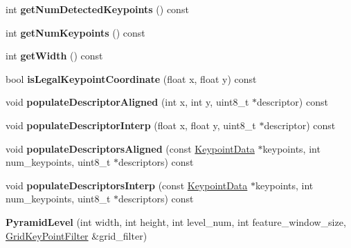 \begin{DoxyCompactItemize}
\item 
\hypertarget{classfovis_1_1PyramidLevel_a6b34494d5f8a1666d216bae16f25640b}{
int {\bfseries getNumDetectedKeypoints} () const }
\label{classfovis_1_1PyramidLevel_a6b34494d5f8a1666d216bae16f25640b}

\item 
\hypertarget{classfovis_1_1PyramidLevel_ac411e38b8e5d28686355d6e7afece27f}{
int {\bfseries getNumKeypoints} () const }
\label{classfovis_1_1PyramidLevel_ac411e38b8e5d28686355d6e7afece27f}

\item 
\hypertarget{classfovis_1_1PyramidLevel_af149cb053bc8b5fbc1364b5dbb934488}{
int {\bfseries getWidth} () const }
\label{classfovis_1_1PyramidLevel_af149cb053bc8b5fbc1364b5dbb934488}

\item 
\hypertarget{classfovis_1_1PyramidLevel_a3a4ff5f0cd0c0b72661126fc123d8838}{
bool {\bfseries isLegalKeypointCoordinate} (float x, float y) const }
\label{classfovis_1_1PyramidLevel_a3a4ff5f0cd0c0b72661126fc123d8838}

\item 
\hypertarget{classfovis_1_1PyramidLevel_af4ea0dd228424433c9427082b2e7b6bc}{
void {\bfseries populateDescriptorAligned} (int x, int y, uint8\_\-t $\ast$descriptor) const }
\label{classfovis_1_1PyramidLevel_af4ea0dd228424433c9427082b2e7b6bc}

\item 
\hypertarget{classfovis_1_1PyramidLevel_a09ba1facc91001f282aa0e6773154e97}{
void {\bfseries populateDescriptorInterp} (float x, float y, uint8\_\-t $\ast$descriptor) const }
\label{classfovis_1_1PyramidLevel_a09ba1facc91001f282aa0e6773154e97}

\item 
\hypertarget{classfovis_1_1PyramidLevel_a525d0403c51c51b9548b05b83ac8fb37}{
void {\bfseries populateDescriptorsAligned} (const \hyperlink{classfovis_1_1KeypointData}{KeypointData} $\ast$keypoints, int num\_\-keypoints, uint8\_\-t $\ast$descriptors) const }
\label{classfovis_1_1PyramidLevel_a525d0403c51c51b9548b05b83ac8fb37}

\item 
\hypertarget{classfovis_1_1PyramidLevel_a686da131ed7363eb73ec6643e25d0d27}{
void {\bfseries populateDescriptorsInterp} (const \hyperlink{classfovis_1_1KeypointData}{KeypointData} $\ast$keypoints, int num\_\-keypoints, uint8\_\-t $\ast$descriptors) const }
\label{classfovis_1_1PyramidLevel_a686da131ed7363eb73ec6643e25d0d27}

\item 
\hypertarget{classfovis_1_1PyramidLevel_a1d7e0bd5a1376e477d5f574783b4620f}{
{\bfseries PyramidLevel} (int width, int height, int level\_\-num, int feature\_\-window\_\-size, \hyperlink{classfovis_1_1GridKeyPointFilter}{GridKeyPointFilter} \&grid\_\-filter)}
\label{classfovis_1_1PyramidLevel_a1d7e0bd5a1376e477d5f574783b4620f}

\end{DoxyCompactItemize}
